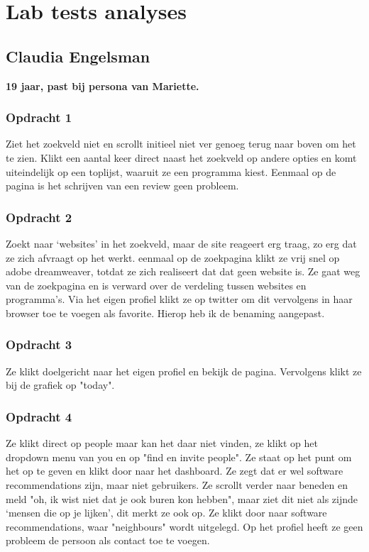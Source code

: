 \chapter{Lab tests analyses}
    \label{labtestsappendix}

\section{Claudia Engelsman}
\textbf{19 jaar, past bij persona van Mariette.}

\subsection{Opdracht 1}
  Ziet het zoekveld niet en scrollt initieel niet ver genoeg terug naar boven om het te zien. Klikt een aantal keer direct naast het zoekveld op andere opties en komt uiteindelijk op een toplijst, waaruit ze een programma kiest. Eenmaal op de pagina is het schrijven van een review geen probleem.

\subsection{Opdracht 2}
  Zoekt naar `websites' in het zoekveld, maar de site reageert erg traag, zo erg dat ze zich afvraagt op het werkt. eenmaal op de zoekpagina klikt ze vrij snel op adobe dreamweaver, totdat ze zich realiseert dat dat geen website is. Ze gaat weg van de zoekpagina en is verward over de verdeling tussen websites en programma's. Via het eigen profiel klikt ze op twitter om dit vervolgens in haar browser toe te voegen als favorite. Hierop heb ik de benaming aangepast.

\subsection{Opdracht 3}
  Ze klikt doelgericht naar het eigen profiel en bekijk de pagina. Vervolgens klikt ze bij de grafiek op "today".

\subsection{Opdracht 4}
 Ze klikt direct op people maar kan het daar niet vinden, ze klikt op het dropdown menu van you en op "find en invite people". Ze staat op het punt om het op te geven en klikt door naar het dashboard. Ze zegt dat er wel software recommendations zijn, maar niet gebruikers. Ze scrollt verder naar beneden en meld "oh, ik wist niet dat je ook buren kon hebben", maar ziet dit niet als zijnde `mensen die op je lijken', dit merkt ze ook op. Ze klikt door naar software recommendations, waar "neighbours" wordt uitgelegd. Op het profiel heeft ze geen probleem de persoon als contact toe te voegen.

